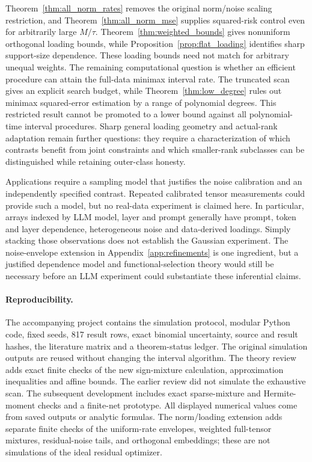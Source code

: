 \documentclass[11pt]{article}
\theoremstyle{remark}
\begin{document}
Theorem~\ref{thm:all_norm_rates} removes the original norm/noise scaling restriction, and Theorem~\ref{thm:all_norm_mse} supplies squared-risk control even for arbitrarily large $M/\tau$. Theorem~\ref{thm:weighted_bounds} gives nonuniform orthogonal loading bounds, while Proposition~\ref{prop:flat_loading} identifies sharp support-size dependence. These loading bounds need not match for arbitrary unequal weights. The remaining computational question is whether an efficient procedure can attain the full-data minimax interval rate. The truncated scan gives an explicit search budget, while Theorem~\ref{thm:low_degree} rules out minimax squared-error estimation by a range of polynomial degrees. This restricted result cannot be promoted to a lower bound against all polynomial-time interval procedures. Sharp general loading geometry and actual-rank adaptation remain further questions: they require a characterization of which contrasts benefit from joint constraints and which smaller-rank subclasses can be distinguished while retaining outer-class honesty.

Applications require a sampling model that justifies the noise calibration and an independently specified contrast. Repeated calibrated tensor measurements could provide such a model, but no real-data experiment is claimed here. In particular, arrays indexed by LLM model, layer and prompt generally have prompt, token and layer dependence, heterogeneous noise and data-derived loadings. Simply stacking those observations does not establish the Gaussian experiment. The noise-envelope extension in Appendix~\ref{app:refinements} is one ingredient, but a justified dependence model and functional-selection theory would still be necessary before an LLM experiment could substantiate these inferential claims.

\paragraph{Reproducibility.}
The accompanying project contains the simulation protocol, modular Python code, fixed seeds, 817 result rows, exact binomial uncertainty, source and result hashes, the literature matrix and a theorem-status ledger. The original simulation outputs are reused without changing the interval algorithm. The theory review adds exact finite checks of the new sign-mixture calculation, approximation inequalities and affine bounds. The earlier review did not simulate the exhaustive scan. The subsequent development includes exact sparse-mixture and Hermite-moment checks and a finite-net prototype. All displayed numerical values come from saved outputs or analytic formulas. The norm/loading extension adds separate finite checks of the uniform-rate envelopes, weighted full-tensor mixtures, residual-noise tails, and orthogonal embeddings; these are not simulations of the ideal residual optimizer.

\appendix








\end{document}
